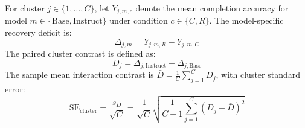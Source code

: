 \documentclass[11pt,letterpaper]{article}
\begin{document}
For cluster $j \in \{1, \dots, C\}$, let $Y_{j, m, c}$ denote the mean completion accuracy for model $m \in \{\text{Base}, \text{Instruct}\}$ under condition $c \in \{C, R\}$. The model-specific recovery deficit is:
\begin{equation}
\Delta_{j, m} = Y_{j, m, R} - Y_{j, m, C}
\end{equation}
The paired cluster contrast is defined as:
\begin{equation}
D_j = \Delta_{j, \text{Instruct}} - \Delta_{j, \text{Base}}
\end{equation}
The sample mean interaction contrast is $\bar{D} = \frac{1}{C}\sum_{j=1}^{C} D_j$, with cluster standard error:
\begin{equation}
\mathrm{SE}_{\text{cluster}} = \frac{s_D}{\sqrt{C}} = \frac{1}{\sqrt{C}} \sqrt{\frac{1}{C-1}\sum_{j=1}^{C}(D_j - \bar{D})^2}
\end{equation}
\end{document}

